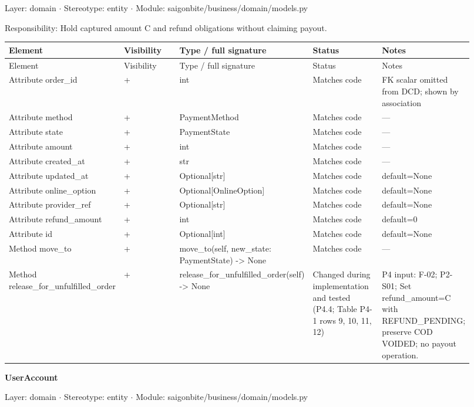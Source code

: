 Layer: domain \ensuremath{\cdot} Stereotype: \guillemotleft{}entity\guillemotright{} \ensuremath{\cdot} Module: saigonbite/business/domain/models.py

Responsibility: Hold captured amount C and refund obligations without claiming payout.

\begin{longtable}{>{\raggedright\arraybackslash}p{0.1840\linewidth}>{\raggedright\arraybackslash}p{0.1840\linewidth}>{\raggedright\arraybackslash}p{0.1840\linewidth}>{\raggedright\arraybackslash}p{0.1840\linewidth}>{\raggedright\arraybackslash}p{0.1840\linewidth}}
Element & Visibility & Type / full signature & Status & Notes \\
\hline\endfirsthead
Element & Visibility & Type / full signature & Status & Notes \\
\hline\endhead
Attribute order\_id & + & int & Matches code & FK scalar omitted from DCD; shown by association \\
Attribute method & + & PaymentMethod & Matches code & --- \\
Attribute state & + & PaymentState & Matches code & --- \\
Attribute amount & + & int & Matches code & --- \\
Attribute created\_at & + & str & Matches code & --- \\
Attribute updated\_at & + & Optional[str] & Matches code & default=None \\
Attribute online\_option & + & Optional[OnlineOption] & Matches code & default=None \\
Attribute provider\_ref & + & Optional[str] & Matches code & default=None \\
Attribute refund\_amount & + & int & Matches code & default=0 \\
Attribute id & + & Optional[int] & Matches code & default=None \\
Method move\_to & + & move\_to(self, new\_state: PaymentState) -\textgreater{} None & Matches code & --- \\
Method release\_for\_unfulfilled\_order & + & release\_for\_unfulfilled\_order(self) -\textgreater{} None & Changed during implementation and tested (P4.4; Table P4-1 rows 9, 10, 11, 12) & P4 input: F-02; P2-S01; Set refund\_amount=C with REFUND\_PENDING; preserve COD VOIDED; no payout operation. \\
\end{longtable}
\textbf{UserAccount}

Layer: domain \ensuremath{\cdot} Stereotype: \guillemotleft{}entity\guillemotright{} \ensuremath{\cdot} Module: saigonbite/business/domain/models.py

